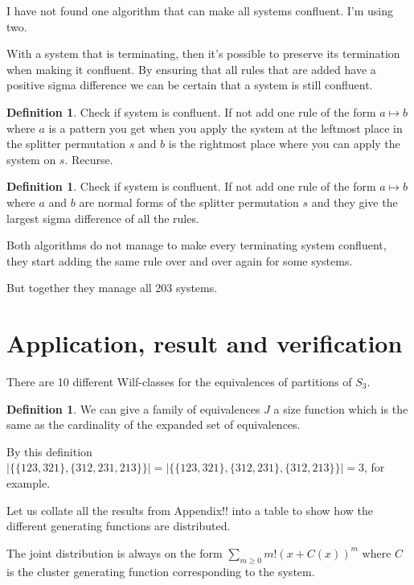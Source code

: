 \documentclass[a4paper, 11pt, english]{article}
\newcommand{\patternrule}{ \mapsto \!}
\theoremstyle{definition}
\newtheorem{definition}[theorem]{Definition}
\begin{document}
I have not found one algorithm that can make all systems confluent.
I'm using two.

With a system that is terminating, then it's possible to preserve its
termination when making it confluent.
By ensuring that all rules that are added have a positive sigma difference
we can be certain that a system is still confluent. 

\begin{definition}
    Check if system is confluent. If not add one rule of the form $a
    \patternrule b$ where $a$ is a pattern you get when you apply the system at
    the leftmost place in the splitter permutation $s$ and $b$ is the rightmost
    place where you can apply the system on $s$. Recurse.
\end{definition}

\begin{definition}
    Check if system is confluent. If not add one rule of the form $a
    \patternrule b$ where $a$ and $b$ are normal forms of the splitter
    permutation $s$ and they give the largest sigma difference of all the rules.
\end{definition}

Both algorithms do not manage to make every terminating system confluent, they
start adding the same rule over and over again for some systems.

But together they manage all 203 systems.

\section{Application, result and verification}
There are 10 different Wilf-classes for the equivalences of partitions of $S_3$.

\begin{definition}
    We can give a family of equivalences $J$ a size function which is the same
    as the cardinality of the expanded set of equivalences.

    By this definition $| \{ \{ 123, 321 \}, \{ 312, 231, 213 \} \}| = | \{ \{
    123, 321 \}, \{ 312, 231 \}, \{ 312, 213 \} \} | = 3$, for example.
\end{definition}

Let us collate all the results from Appendix!! into a table to show how the
different generating functions are distributed.

The joint distribution is always on the form $\sum_{m \geq 0}m!(x+C(x))^m$ where $C$
is the cluster generating function corresponding to the system.
\end{document}
